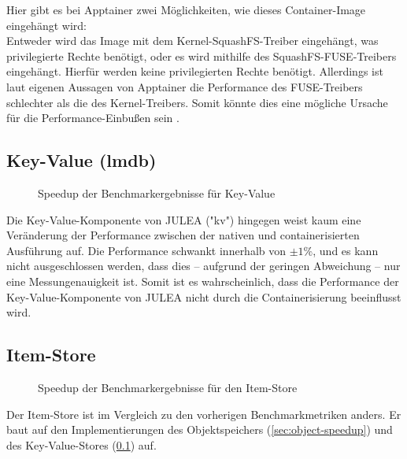 Hier gibt es bei Apptainer zwei Möglichkeiten, wie dieses Container-Image eingehängt wird: \\
Entweder wird das Image mit dem Kernel-SquashFS-Treiber eingehängt, was privilegierte Rechte benötigt, oder es wird mithilfe des SquashFS-FUSE-Treibers eingehängt. Hierfür werden keine privilegierten Rechte benötigt. Allerdings ist laut eigenen Aussagen von Apptainer die Performance des FUSE-Treibers schlechter als die des Kernel-Treibers. Somit könnte dies eine mögliche Ursache für die Performance-Einbußen sein \cite{apptainerSecurityApptainerApptainer}.  

\subsection{Key-Value (lmdb)} \label{sec:kv-speedup}

\begin{figure}[H]
    \centering
    
    \caption{Speedup der Benchmarkergebnisse für Key-Value}
    \label{fig:speedup_kv}
\end{figure}

\FloatBarrier

Die Key-Value-Komponente von JULEA ("kv") hingegen weist kaum eine Veränderung der Performance zwischen der nativen und containerisierten Ausführung auf. Die Performance schwankt innerhalb von $\pm 1\%$, und es kann nicht ausgeschlossen werden, dass dies – aufgrund der geringen Abweichung – nur eine Messungenauigkeit ist. Somit ist es wahrscheinlich, dass die Performance der Key-Value-Komponente von JULEA nicht durch die Containerisierung beeinflusst wird.

\subsection{Item-Store}

\begin{figure}[H]
    \centering
    
    \caption{Speedup der Benchmarkergebnisse für den Item-Store}
    \label{fig:speedup_item}
\end{figure}

\FloatBarrier

Der Item-Store ist im Vergleich zu den vorherigen Benchmarkmetriken anders. Er baut auf den Implementierungen des Objektspeichers (\cref{sec:object-speedup}) und des Key-Value-Stores (\cref{sec:kv-speedup}) auf.

